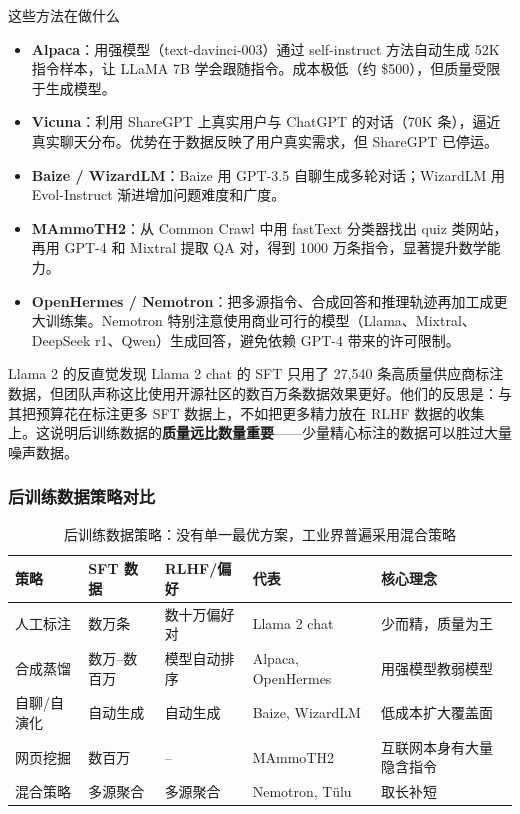 \documentclass[a4paper]{article}
\begin{document}
\begin{knowledgebox}{这些方法在做什么}
\begin{itemize}
    \item \textbf{Alpaca}：用强模型（text-davinci-003）通过 self-instruct 方法自动生成 52K 指令样本，让 LLaMA 7B 学会跟随指令。成本极低（约 \$500），但质量受限于生成模型。
    \item \textbf{Vicuna}：利用 ShareGPT 上真实用户与 ChatGPT 的对话（70K 条），逼近真实聊天分布。优势在于数据反映了用户真实需求，但 ShareGPT 已停运。
    \item \textbf{Baize / WizardLM}：Baize 用 GPT-3.5 自聊生成多轮对话；WizardLM 用 Evol-Instruct 渐进增加问题难度和广度。
    \item \textbf{MAmmoTH2}：从 Common Crawl 中用 fastText 分类器找出 quiz 类网站，再用 GPT-4 和 Mixtral 提取 QA 对，得到 1000 万条指令，显著提升数学能力。
    \item \textbf{OpenHermes / Nemotron}：把多源指令、合成回答和推理轨迹再加工成更大训练集。Nemotron 特别注意使用商业可行的模型（Llama、Mixtral、DeepSeek r1、Qwen）生成回答，避免依赖 GPT-4 带来的许可限制。
\end{itemize}
\end{knowledgebox}

\begin{importantbox}{Llama 2 的反直觉发现}
Llama 2 chat 的 SFT 只用了 27,540 条高质量供应商标注数据，但团队声称这比使用开源社区的数百万条数据效果更好。他们的反思是：与其把预算花在标注更多 SFT 数据上，不如把更多精力放在 RLHF 数据的收集上。这说明后训练数据的\textbf{质量远比数量重要}——少量精心标注的数据可以胜过大量噪声数据。
\end{importantbox}

\subsubsection{后训练数据策略对比}

\begin{table}[H]
\centering
\begin{tabular}{p{}p{}p{}p{}p{}}
\toprule
\textbf{策略} & \textbf{SFT 数据} & \textbf{RLHF/偏好} & \textbf{代表} & \textbf{核心理念} \\
\midrule
人工标注 & 数万条 & 数十万偏好对 & Llama 2 chat & 少而精，质量为王 \\
合成蒸馏 & 数万--数百万 & 模型自动排序 & Alpaca, OpenHermes & 用强模型教弱模型 \\
自聊/自演化 & 自动生成 & 自动生成 & Baize, WizardLM & 低成本扩大覆盖面 \\
网页挖掘 & 数百万 & -- & MAmmoTH2 & 互联网本身有大量隐含指令 \\
混合策略 & 多源聚合 & 多源聚合 & Nemotron, T\"ulu & 取长补短 \\
\bottomrule
\end{tabular}
\caption{后训练数据策略：没有单一最优方案，工业界普遍采用混合策略}
\end{table}
\end{document}
